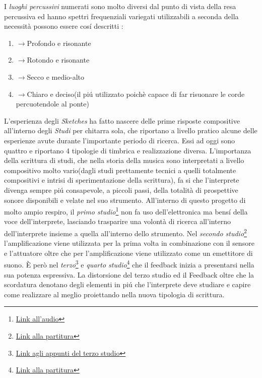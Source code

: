 \documentclass[oneside]{article}
\begin{document}
\begin{multicols*}{2}
I \textit{luoghi percussivi} numerati sono molto diversi dal punto di vista della resa percussiva ed hanno spettri frequenziali variegati utilizzabili a seconda della necessità possono essere cosí descritti :
\begin{enumerate}
\item $\longrightarrow$Profondo e risonante 
\item $\longrightarrow$Rotondo e risonante
\item $\longrightarrow$Secco e medio-alto
\item $\longrightarrow$Chiaro e deciso(il piú utilizzato poichè capace di far risuonare le corde percuotendole al ponte)
\end{enumerate}

L'esperienza degli \textit{Sketches} ha fatto nascere delle prime risposte compositive all'interno degli \textit{Studi} per chitarra sola, che riportano a livello pratico alcune delle esperienze avute durante l'importante periodo di ricerca. Essi ad oggi sono quattro e riportano 4 tipologie di timbrica e realizzazione diversa.
L'importanza della scrittura di studi, che nella storia della musica sono interpretati a livello compositivo molto vario(dagli studi prettamente tecnici a quelli totalmente compositivi e intrisi di sperimentazione della scrittura), fa si che l'interprete divenga sempre piú consapevole, a piccoli passi, della totalità di prospettive sonore disponibili e velate nel suo strumento. All'interno di questo progetto di molto ampio respiro, il \textit{primo studio}\footnote{\href{https://github.com/SMERM/BN-Tedesco/blob/master/COME-02/Lezioni_in_Compresenza/20200331/Draft_1_Studio_n.1_Audio.wav}{Link all'audio}} non fa uso dell'elettronica ma bensí della voce dell'interprete, lasciando trasparire una volontà di ricerca all'interno dell'interprete insieme a quella all'interno dello strumento. Nel \textit{secondo studio}\footnote{\href{https://github.com/SMERM/BN-Tedesco/blob/master/COME-02/Lezioni_in_Compresenza/20200407/Draft_1\%20Studio\%20n.2\%20Partitura.pdf}{Link alla partitura}} l'amplificazione viene utilizzata per la prima volta in combinazione con il sensore e l'attuatore oltre che per l'amplificazione viene utilizzato come un emettitore di suono. È però nel \textit{terzo}\footnote{\href{https://github.com/SMERM/BN-Tedesco/blob/master/COME-02/Lezioni_in_Compresenza/20200519/Appunti_Studio_n.3_a.jpeg}{Link agli appunti del terzo studio}} e \textit{quarto studio}\footnote{\href{https://github.com/SMERM/BN-Tedesco/blob/master/COME-02/Lezioni_in_Compresenza/20200616/Studio_n.4_a.pdf}{Link alla partitura}} che il feedback inizia a presentarsi nella sua potenza espressiva. La distorsione del terzo studio ed il Feedback oltre che la scordatura denotano degli elementi in piú che l'interprete deve studiare e capire come realizzare al meglio proiettando nella nuova tipologia di scrittura.


\end{multicols*}
\end{document}

